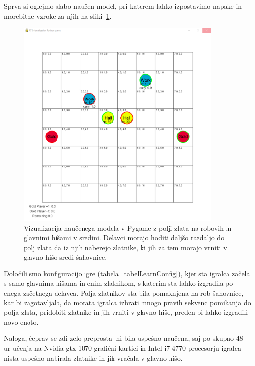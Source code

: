 \documentclass[a4paper, 12pt]{book}
\begin{document}
Sprva si oglejmo slabo naučen model, pri katerem lahko izpostavimo napake in morebitne vzroke za njih na sliki~\ref{vizualizacijaRezultatovSpremembaZlata}.
\begin{figure}[h!]
	\begin{center}
		\includegraphics[width=0.9\textwidth]{photos/third-2018-11-14.pdf}
	\end{center}
	\caption{Vizualizacija naučenega modela v Pygame z polji zlata na robovih in glavnimi hišami v sredini. Delavci morajo hoditi daljšo razdaljo do polj zlata da iz njih naberejo zlatnike, ki jih za tem morajo vrniti v glavno hišo sredi šahovnice. }
	\label{vizualizacijaRezultatovSpremembaZlata}
\end{figure}

Določili smo konfiguracijo igre (tabela~\ref{tabelLearnConfig}), kjer sta igralca začela s samo glavnima hišama in enim zlatnikom, s katerim sta lahko izgradila po enega začetnega delavca.
Polja zlatnikov sta bila pomaknjena na rob šahovnice, kar bi zagotavljalo, da morata igralca izbrati mnogo pravih sekvenc pomikanja do polja zlata, pridobiti zlatnike in jih vrniti v glavno hišo, preden bi lahko izgradili novo enoto.

Naloga, čeprav se zdi zelo preprosta, ni bila uspešno naučena, saj po skupno 48 ur učenja na Nvidia gtx 1070 grafični kartici in Intel i7 4770 procesorju igralca nista uspešno nabirala zlatnike in jih vračala v glavno hišo.
\end{document}
